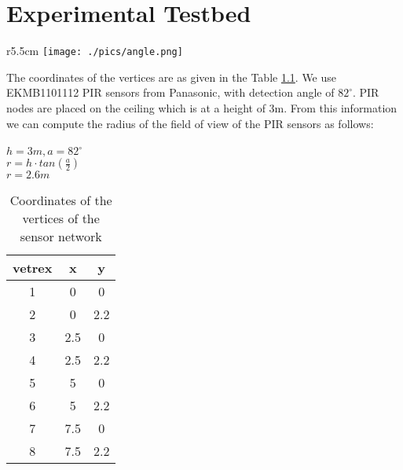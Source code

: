 \chapter{Experimental Testbed}
\label{app:A}

\begin{wrapfigure}{r}{5.5cm}
\texttt{[image: ./pics/angle.png]}
\label{fig:height}
\end{wrapfigure}
The coordinates of the vertices are as given in the Table \ref{tab:htc34xy}. We use EKMB1101112 PIR sensors from Panasonic, with detection angle of $82^\circ$.
PIR nodes are placed on the ceiling which is at a height of 3m. From this information we can compute the radius of the field of view of the PIR sensors as follows:\\\\
$h=3m, a = 82^{\circ}$\\
$r=h\cdot tan(\frac{a}{2})$\\
$r=2.6m$\\






\begin{table}[]
\centering
\caption{Coordinates of the vertices of the sensor network}
\label{tab:htc34xy}
\begin{tabular}{|c|c|c|}
\hline
vetrex & x   & y   \\ \hline
1      & 0   & 0   \\ \hline
2      & 0   & 2.2 \\ \hline
3      & 2.5 & 0   \\ \hline
4      & 2.5 & 2.2 \\ \hline
5      & 5   & 0   \\ \hline
6      & 5   & 2.2 \\ \hline
7      & 7.5 & 0   \\ \hline
8      & 7.5 & 2.2 \\ \hline
\end{tabular}
\end{table}

